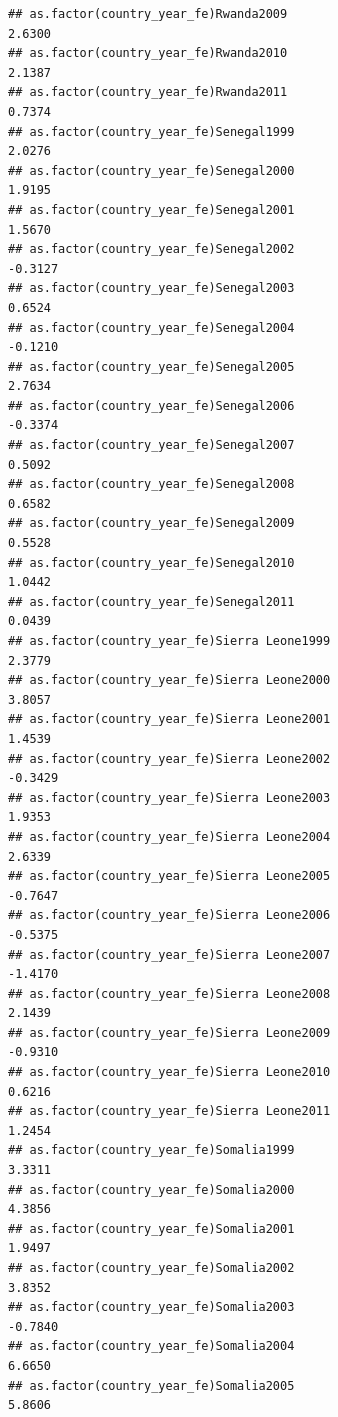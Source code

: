 \documentclass[
  a4paper,
]{article}
\begin{document}
\begin{verbatim}
## as.factor(country_year_fe)Rwanda2009                            2.6300
## as.factor(country_year_fe)Rwanda2010                            2.1387
## as.factor(country_year_fe)Rwanda2011                            0.7374
## as.factor(country_year_fe)Senegal1999                           2.0276
## as.factor(country_year_fe)Senegal2000                           1.9195
## as.factor(country_year_fe)Senegal2001                           1.5670
## as.factor(country_year_fe)Senegal2002                          -0.3127
## as.factor(country_year_fe)Senegal2003                           0.6524
## as.factor(country_year_fe)Senegal2004                          -0.1210
## as.factor(country_year_fe)Senegal2005                           2.7634
## as.factor(country_year_fe)Senegal2006                          -0.3374
## as.factor(country_year_fe)Senegal2007                           0.5092
## as.factor(country_year_fe)Senegal2008                           0.6582
## as.factor(country_year_fe)Senegal2009                           0.5528
## as.factor(country_year_fe)Senegal2010                           1.0442
## as.factor(country_year_fe)Senegal2011                           0.0439
## as.factor(country_year_fe)Sierra Leone1999                      2.3779
## as.factor(country_year_fe)Sierra Leone2000                      3.8057
## as.factor(country_year_fe)Sierra Leone2001                      1.4539
## as.factor(country_year_fe)Sierra Leone2002                     -0.3429
## as.factor(country_year_fe)Sierra Leone2003                      1.9353
## as.factor(country_year_fe)Sierra Leone2004                      2.6339
## as.factor(country_year_fe)Sierra Leone2005                     -0.7647
## as.factor(country_year_fe)Sierra Leone2006                     -0.5375
## as.factor(country_year_fe)Sierra Leone2007                     -1.4170
## as.factor(country_year_fe)Sierra Leone2008                      2.1439
## as.factor(country_year_fe)Sierra Leone2009                     -0.9310
## as.factor(country_year_fe)Sierra Leone2010                      0.6216
## as.factor(country_year_fe)Sierra Leone2011                      1.2454
## as.factor(country_year_fe)Somalia1999                           3.3311
## as.factor(country_year_fe)Somalia2000                           4.3856
## as.factor(country_year_fe)Somalia2001                           1.9497
## as.factor(country_year_fe)Somalia2002                           3.8352
## as.factor(country_year_fe)Somalia2003                          -0.7840
## as.factor(country_year_fe)Somalia2004                           6.6650
## as.factor(country_year_fe)Somalia2005                           5.8606

\end{verbatim}
\end{document}
